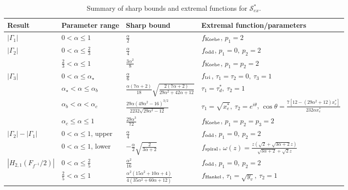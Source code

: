 \documentclass[11pt,reqno]{amsart}
\numberwithin{equation}{section}
\begin{document}
\begin{table}[htbp]
\centering
\caption{Summary of sharp bounds and extremal functions for \(\mathcal{S}_{ex}^{\ast}\).}
\label{tab:summary}
\setlength{\tabcolsep}{3pt}
\scriptsize
\begin{tabular}{|p{1.8cm}|p{3.2cm}|p{3.8cm}|p{4.4cm}|}
\hline
\textbf{Result} & \textbf{Parameter range} & \textbf{Sharp bound} & \textbf{Extremal function/parameters} \\
\hline
\(|\Gamma_1|\) & \(0<\alpha\le1\) & \(\displaystyle\frac{\alpha}{2}\) & \(f_{\rm Koebe}\), \(p_1=2\) \\
\hline
\multirow{2}{*}{\(|\Gamma_2|\)}
& \(0<\alpha\le\frac23\) & \(\displaystyle\frac{\alpha}{4}\) & \(f_{\rm odd}\), \(p_1=0,\ p_2=2\) \\
\cline{2-4}
& \(\frac23<\alpha\le1\) & \(\displaystyle\frac{3\alpha^2}{8}\) & \(f_{\rm Koebe}\), \(p_1=p_2=2\) \\
\hline
\multirow{4}{*}{\(|\Gamma_3|\)}
& \(0<\alpha\le\alpha_\star\) & \(\displaystyle\frac{\alpha}{6}\) & \(f_{\rm tri}\), \(\tau_1=\tau_2=0,\ \tau_3=1\) \\
\cline{2-4}
& \(\alpha_\star<\alpha\le\alpha_b\) & \(\displaystyle\frac{\alpha(7\alpha+2)}{18}\sqrt{\frac{2(7\alpha+2)}{29\alpha^2+42\alpha+12}}\) & \(\tau_1=\tau_d^*,\ \tau_2=1\) \\
\cline{2-4}
& \(\alpha_b<\alpha<\alpha_c\) & \(\displaystyle\frac{29\alpha(49\alpha^2-16)^{3/2}}{2232\sqrt{29\alpha^2-12}}\) & \(\tau_1=\sqrt{x_e^*},\ \tau_2=e^{i\theta}\), \(\cos\theta=\frac{7[12-(29\alpha^2+12)x_e^*]}{232\alpha x_e^*}\) \\
\cline{2-4}
& \(\alpha_c\le\alpha\le1\) & \(\displaystyle\frac{29\alpha^3}{72}\) & \(f_{\rm Koebe}\), \(p_1=p_2=p_3=2\) \\
\hline
\multirow{2}{*}{\(|\Gamma_2|-|\Gamma_1|\)}
& \(0<\alpha\le1\), upper & \(\displaystyle\frac{\alpha}{4}\) & \(f_{\rm odd}\), \(p_1=0,\ p_2=2\) \\
\cline{2-4}
& \(0<\alpha\le1\), lower & \(\displaystyle-\frac{\alpha}{2}\sqrt{\frac{2}{3\alpha+2}}\) & \(f_{\rm spiral}\), \(\omega(z)=\frac{z(\sqrt2+\sqrt{3\alpha+2}z)}{\sqrt{3\alpha+2}+\sqrt2 z}\) \\
\hline
\multirow{2}{*}{\(|H_{2,1}(F_{f^{-1}}/2)|\)}
& \(0<\alpha\le\frac25\) & \(\displaystyle\frac{\alpha^2}{16}\) & \(f_{\rm odd}\), \(p_1=0,\ p_2=2\) \\
\cline{2-4}
& \(\frac25<\alpha\le1\) & \(\displaystyle\frac{\alpha^2(15\alpha^2+10\alpha+4)}{4(35\alpha^2+60\alpha+12)}\) & \(f_{\rm Hankel}\), \(\tau_1=\sqrt{y_v},\ \tau_2=1\) \\

\end{tabular}
\end{table}
\end{document}
